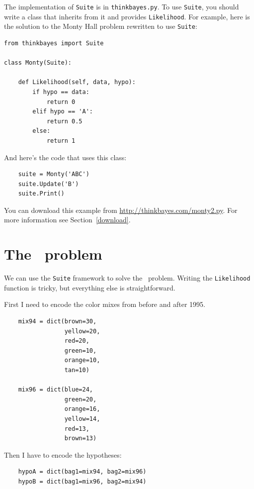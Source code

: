 \documentclass[12pt]{book}
\begin{document}
The implementation of \verb"Suite" is in \verb"thinkbayes.py".  To use
\verb"Suite", you should write a class that inherits from it and
provides \verb"Likelihood".  For example, here is the solution to the
Monty Hall problem rewritten to use \verb"Suite":

\begin{verbatim}
from thinkbayes import Suite

class Monty(Suite):

    def Likelihood(self, data, hypo):
        if hypo == data:
            return 0
        elif hypo == 'A':
            return 0.5
        else:
            return 1
\end{verbatim}

And here's the code that uses this class:

\begin{verbatim}
    suite = Monty('ABC')
    suite.Update('B')
    suite.Print()
\end{verbatim}

You can download this example from
\url{http://thinkbayes.com/monty2.py}.
  For more information
see Section~\ref{download}.


\section{The \MM~problem}

We can use the \verb"Suite" framework to solve the \MM~problem.
Writing the \verb"Likelihood" function is tricky, but everything
else is straightforward.

First I need to encode the color mixes from before and
after 1995.

\begin{verbatim}
    mix94 = dict(brown=30,
                 yellow=20,
                 red=20,
                 green=10,
                 orange=10,
                 tan=10)

    mix96 = dict(blue=24,
                 green=20,
                 orange=16,
                 yellow=14,
                 red=13,
                 brown=13)
\end{verbatim}

Then I have to encode the hypotheses:

\begin{verbatim}
    hypoA = dict(bag1=mix94, bag2=mix96)
    hypoB = dict(bag1=mix96, bag2=mix94)
\end{verbatim}
\end{document}
